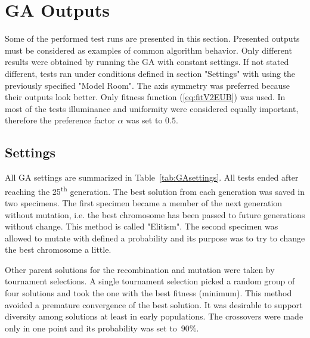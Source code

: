 \section{GA Outputs}
Some of the performed test runs are presented in this section. Presented outputs must be considered as examples of common algorithm behavior. Only different results were obtained by running the GA with constant settings. If not stated different, tests ran under conditions defined in section "Settings" with using the previously specified "Model Room". The axis symmetry was preferred because their outputs look better. Only fitness function (\ref{eq:fitV2EUB}) was used. In most of the tests illuminance and uniformity were considered equally important, therefore the preference factor $\alpha$ was set to $0.5$.

\subsection{Settings}

All GA settings are summarized in Table~\ref{tab:GAsettings}. All tests ended after reaching the 25\textsuperscript{th} generation. The best solution from each generation was saved in two specimens. The first specimen became a member of the next generation without mutation, i.e. the best chromosome has been passed to future generations without change. This method is called "Elitism". The second specimen was allowed to mutate with defined a probability and its purpose was to try to change the best chromosome a little.

Other parent solutions for the recombination and mutation were taken by tournament selections. A single tournament selection picked a random group of four solutions and took the one with the best fitness (minimum). This method avoided a premature convergence of the best solution. It was desirable to support diversity among solutions at least in early populations. The crossovers were made only in one point and its probability was set to~$90 \%$.


